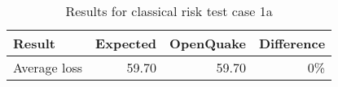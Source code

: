 \begin{table}[htbp]

\centering
\begin{tabular}{ l r r r }

\hline
\rowcolor{anti-flashwhite}
\bf{Result} & \bf{Expected} & \bf{OpenQuake} & \bf{Difference}\\
\hline
Average loss & 59.70 & 59.70 & 0\% \\
\hline
\end{tabular}

\caption{Results for classical risk test case 1a}
\label{tab:result-classical-risk-1a}
\end{table}